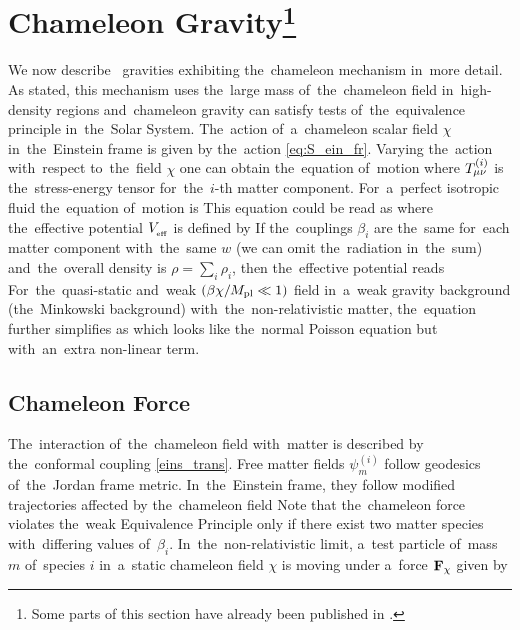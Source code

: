 \section[Chameleon Gravity]{Chameleon Gravity\footnote{Some parts of this section have already been published in \textcite{mastersthesis_vrastil}.}}
\label{sec_cham}
We now describe \fR\ gravities exhibiting the~chameleon mechanism in~more detail. As stated, this mechanism uses the~large mass of~the~chameleon field in~high-density regions and~chameleon gravity can satisfy tests of~the~equivalence principle in~the~Solar System. The~action of~a~chameleon scalar field $\chi$ in~the~Einstein frame is given by the~action \eqref{eq:S_ein_fr}. Varying the~action with~respect to~the~field $\chi$ one can obtain the~equation of~motion
where $T^{(i)}_{\mu\nu}$ is the~stress-energy tensor for~the~$i$-th matter component. For~a~perfect isotropic fluid the~equation of~motion is
This equation could be read as
where the~effective potential $V_{_\text{\tiny eff}}$ is defined by
If the~couplings $\beta_i$ are the~same for~each matter component with~the~same $w$ (we can omit the~radiation in~the~sum) and~the~overall density is $\rho=\sum_i\rho_i$, then the~effective potential reads
For~the~quasi-static and~weak $(\beta\chi/M_{\text{\scriptsize pl}}\ll1)$ field in~a~weak gravity background (the~Minkowski background) with~the~non-relativistic matter, the~equation further simplifies as
which looks like the~normal Poisson equation but with~an~extra non-linear term.
\subsection{Chameleon Force}
The~interaction of~the~chameleon field with~matter is described by the~conformal coupling \eqref{eins_trans}. Free matter fields $\psi_m^{(i)}$ follow geodesics of~the~Jordan frame metric. In~the~Einstein frame, they follow modified trajectories affected by the~chameleon field \parencite{Waterhouse:2006wv}
Note that the~chameleon force violates the~weak Equivalence Principle only if there exist two matter species with~differing values of~$\beta_i$. In~the~non-relativistic limit, a~test particle of~mass $m$ of~species $i$ in~a~static chameleon field $\chi$ is moving under a~force $\mathbf{F}_\chi$ given by
